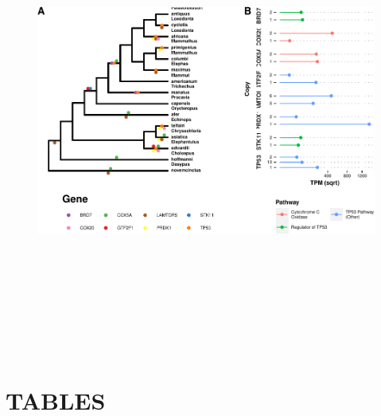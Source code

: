 \documentclass[]{elsarticle} %
\begin{document}
\begin{figure}

\includegraphics[width=6in,height=6in]{paper_PLOS_draft_files/figure-latex/Figure-loxAfrTP53-1} \hfill{}

\end{figure}

\hypertarget{tables}{%
\section{TABLES}\label{tables}}
\end{document}
